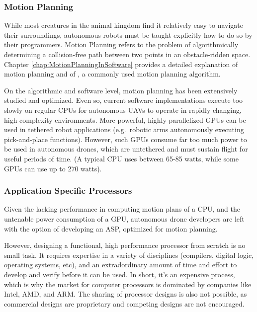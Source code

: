     \subsubsection{Motion Planning}
        
        While most creatures in the animal kingdom find it relatively easy to navigate their surroundings, autonomous robots must be taught explicitly how to do so by their programmers. Motion Planning refers to the problem of algorithmically determining a collision-free path between two points in an obstacle-ridden space. Chapter \ref{chap:MotionPlanningInSoftware} provides a detailed explanation of motion planning and of , a commonly used motion planning algorithm.

        On the algorithmic and software level, motion planning has been extensively studied and optimized. Even so, current software implementations execute too slowly on regular \glspl{CPU} for autonomous \glspl{UAV} to operate in rapidly changing, high complexity environments. More powerful, highly parallelized \glspl{GPU} can be used in tethered robot applications (e.g.\ robotic arms autonomously executing pick-and-place functions). However, such \glspl{GPU} consume far too much power to be used in autonomous drones, which are untethered and must sustain flight for useful periods of time. (A typical \gls{CPU} uses between 65-85 watts, while some \glspl{GPU} can use up to 270 watts).

        
    \subsubsection{Application Specific Processors}

        Given the lacking performance in computing motion plans of a \gls{CPU}, and the untenable power consumption of a \gls{GPU}, autonomous drone developers are left with the option of developing an \gls{ASP}, optimized for motion planning.

        However, designing a functional, high performance processor from scratch is no small task. It requires expertise in a variety of disciplines (compilers, digital logic, operating systems, etc), and an extradordinary amount of time and effort to develop and verify before it can be used. In short, it's an expensive process, which is why the market for computer processors is dominated by companies like Intel, AMD, and ARM. The sharing of processor designs is also not possible, as commercial designs are proprietary and competing designs are not encouraged.


